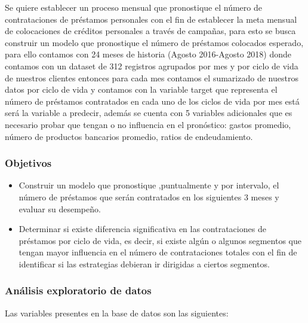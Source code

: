 \documentclass[]{article}
\begin{document}
Se quiere establecer un proceso mensual que pronostique el número de
contrataciones de préstamos personales con el fin de establecer la meta
mensual de colocaciones de créditos personales a través de campañas,
para esto se busca construir un modelo que pronostique el número de
préstamos colocados esperado, para ello contamos con 24 meses de
historia (Agosto 2016-Agosto 2018) donde contamos con un dataset de 312
registros agrupados por mes y por ciclo de vida de nuestros clientes
entonces para cada mes contamos el sumarizado de nuestros datos por
ciclo de vida y contamos con la variable target que representa el número
de préstamos contratados en cada uno de los ciclos de vida por mes está
será la variable a predecir, además se cuenta con 5 variables
adicionales que es necesario probar que tengan o no influencia en el
pronóstico: gastos promedio, número de productos bancarios promedio,
ratios de endeudamiento.

\subsubsection{Objetivos}\label{objetivos}

\begin{itemize}
\item
  Construir un modelo que pronostique ,puntualmente y por intervalo, el
  número de préstamos que serán contratados en los siguientes 3 meses y
  evaluar su desempeño.
\item
  Determinar si existe diferencia significativa en las contrataciones de
  préstamos por ciclo de vida, es decir, si existe algún o algunos
  segmentos que tengan mayor influencia en el número de contrataciones
  totales con el fin de identificar si las estrategias debieran ir
  dirigidas a ciertos segmentos.
\end{itemize}

\subsubsection{Análisis exploratorio de
datos}\label{analisis-exploratorio-de-datos}

Las variables presentes en la base de datos son las siguientes:
\end{document}
